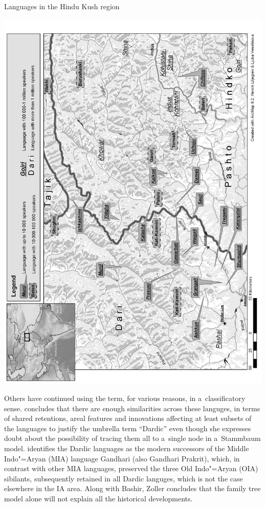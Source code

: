 \begin{mapfigure}[p!]
\caption{Languages in the Hindu Kush region}
\includegraphics[width=\textwidth]{figures/ch1map2.png}
\label{map:1-2}
\end{mapfigure}

Others have continued using the term, for various reasons, in a~classificatory sense. \citet[822]{bashir2003} concludes that there are enough similarities across these languges, in terms of shared retentions, areal features and innovations affecting at least subsets of the languages to justify the umbrella term ``Dardic'' even though she expresses doubt about the possibility of tracing them all to a~single node in a~Stammbaum model. \citet[10--11]{zoller2005} identifies the Dardic languages as the modern successors of the Middle Indo"=Aryan (MIA) language Gandhari (also Gandhari Prakrit), which, in contrast with other MIA languages, preserved the three Old Indo"=Aryan (OIA) sibilants, subsequently retained in all Dardic languges, which is not the case elsewhere in the IA area. Along with Bashir, Zoller concludes that the family tree model alone will not explain all the historical developments. 


